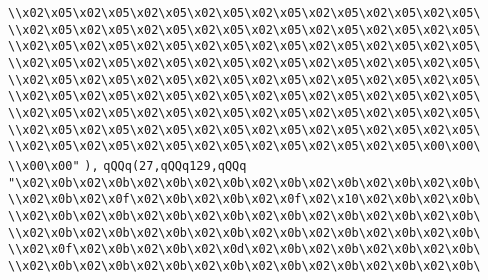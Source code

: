 \verb|\\x02\x05\x02\x05\x02\x05\x02\x05\x02\x05\x02\x05\x02\x05\x02\x05\|\newline
\verb|\\x02\x05\x02\x05\x02\x05\x02\x05\x02\x05\x02\x05\x02\x05\x02\x05\|\newline
\verb|\\x02\x05\x02\x05\x02\x05\x02\x05\x02\x05\x02\x05\x02\x05\x02\x05\|\newline
\verb|\\x02\x05\x02\x05\x02\x05\x02\x05\x02\x05\x02\x05\x02\x05\x02\x05\|\newline
\verb|\\x02\x05\x02\x05\x02\x05\x02\x05\x02\x05\x02\x05\x02\x05\x02\x05\|\newline
\verb|\\x02\x05\x02\x05\x02\x05\x02\x05\x02\x05\x02\x05\x02\x05\x02\x05\|\newline
\verb|\\x02\x05\x02\x05\x02\x05\x02\x05\x02\x05\x02\x05\x02\x05\x02\x05\|\newline
\verb|\\x02\x05\x02\x05\x02\x05\x02\x05\x02\x05\x02\x05\x02\x05\x02\x05\|\newline
\verb|\\x02\x05\x02\x05\x02\x05\x02\x05\x02\x05\x02\x05\x02\x05\x00\x00\|\newline
\verb|\\x00\x00"|\newline
\verb|),|\newline
\verb|qQQq(27,qQQq129,qQQq|\newline
\verb|"\x02\x0b\x02\x0b\x02\x0b\x02\x0b\x02\x0b\x02\x0b\x02\x0b\x02\x0b\|\newline
\verb|\\x02\x0b\x02\x0f\x02\x0b\x02\x0b\x02\x0f\x02\x10\x02\x0b\x02\x0b\|\newline
\verb|\\x02\x0b\x02\x0b\x02\x0b\x02\x0b\x02\x0b\x02\x0b\x02\x0b\x02\x0b\|\newline
\verb|\\x02\x0b\x02\x0b\x02\x0b\x02\x0b\x02\x0b\x02\x0b\x02\x0b\x02\x0b\|\newline
\verb|\\x02\x0f\x02\x0b\x02\x0b\x02\x0d\x02\x0b\x02\x0b\x02\x0b\x02\x0b\|\newline
\verb|\\x02\x0b\x02\x0b\x02\x0b\x02\x0b\x02\x0b\x02\x0b\x02\x0b\x02\x0b\|\newline
